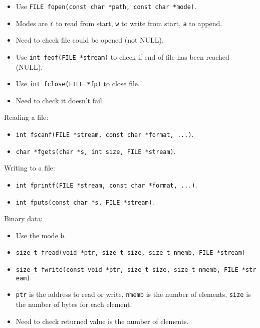 \documentclass[twocolumn,english]{article}
\begin{document}
\begin{itemize}

\item
  Use \texttt{FILE\ fopen(const\ char\ *path,\ const\ char\ *mode)}.
\item
  Modes are \texttt{r} to read from start, \texttt{w} to write from
  start, \texttt{a} to append.
\item
  Need to check file could be opened (not NULL).
\item
  Use \texttt{int\ feof(FILE\ *stream)} to check if end of file has been
  reached (NULL).
\item
  Use \texttt{int\ fclose(FILE\ *fp)} to close file.
\item
  Need to check it doesn't fail.
\end{itemize}

Reading a file:

\begin{itemize}

\item
  \texttt{int\ fscanf(FILE\ *stream,\ const\ char\ *format,\ ...)}.
\item
  \texttt{char\ *fgets(char\ *s,\ int\ size,\ FILE\ *stream)}.
\end{itemize}

Writing to a file:

\begin{itemize}

\item
  \texttt{int\ fprintf(FILE\ *stream,\ const\ char\ *format,\ ...)}.
\item
  \texttt{int\ fputs(const\ char\ *s,\ FILE\ *stream)}.
\end{itemize}

Binary data:

\begin{itemize}

\item
  Use the mode \texttt{b}.
\item
  \texttt{size\_t\ fread(void\ *ptr,\ size\_t\ size,\ size\_t\ nmemb,\ FILE\ *stream)}
\item
  \texttt{size\_t\ fwrite(const\ void\ *ptr,\ size\_t\ size,\ size\_t\ nmemb,\ FILE\ *stream)}
\item
  \texttt{ptr} is the address to read or write, \texttt{nmemb} is the
  number of elements, \texttt{size} is the number of bytes for each
  element.
\item
  Need to check returned value is the number of elements.
\end{itemize}
\end{document}
